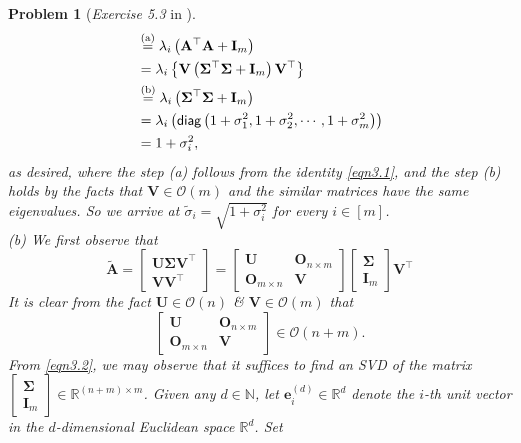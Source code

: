 \documentclass[11pt]{article}
\newtheorem{problem}{Problem}
\begin{document}
\begin{problem} [\emph{Exercise 5.3} in \cite{calafiore2014optimization}]
{\begin{equation*}
\begin{split}
        &\stackrel{\textnormal{(a)}}{=} \lambda_i \left( \mathbf{A}^{\top} \mathbf{A} + \mathbf{I}_m \right) \\
        &= \lambda_i \left\{ \mathbf{V} \left( \mathbf{\Sigma}^{\top} \mathbf{\Sigma} + \mathbf{I}_m \right) \mathbf{V}^{\top} \right\} \\
        &\stackrel{\textnormal{(b)}}{=} \lambda_i \left( \mathbf{\Sigma}^{\top} \mathbf{\Sigma} + \mathbf{I}_m \right) \\
        &= \lambda_i \left( \textsf{diag} \left( 1 + \sigma_{1}^2, 1 + \sigma_{2}^2, \cdots, 1 + \sigma_{m}^2 \right) \right) \\
        &= 1 + \sigma_{i}^2,
    \end{split}
\end{equation*}
as desired, where the step (a) follows from the identity \eqref{eqn3.1}, and the step (b) holds by the facts that $\mathbf{V} \in \mathcal{O}(m)$ and the similar matrices have the same eigenvalues. So we arrive at $\tilde{\sigma}_i = \sqrt{1 + \sigma_{i}^2}$ for every $i \in [m]$. \\ [10pt]
\indent (b) We first observe that
\begin{equation}
    \label{eqn3.2}
    \tilde{\mathbf{A}} =
    \begin{bmatrix}
        \mathbf{U} \mathbf{\Sigma} \mathbf{V}^{\top} \\
        \mathbf{V} \mathbf{V}^{\top}
    \end{bmatrix}
    =
    \begin{bmatrix}
        \mathbf{U} & \mathbf{O}_{n \times m} \\
        \mathbf{O}_{m \times n} & \mathbf{V}
    \end{bmatrix}
    \begin{bmatrix}
        \mathbf{\Sigma} \\ \mathbf{I}_m
    \end{bmatrix}
    \mathbf{V}^{\top}
\end{equation}
It is clear from the fact $\mathbf{U} \in \mathcal{O}(n)$ \& $\mathbf{V} \in \mathcal{O}(m)$ that
\begin{equation}
    \label{eqn3.3}
    \begin{bmatrix}
        \mathbf{U} & \mathbf{O}_{n \times m} \\
        \mathbf{O}_{m \times n} & \mathbf{V}
    \end{bmatrix}
    \in \mathcal{O}(n+m).
\end{equation}
From \eqref{eqn3.2}, we may observe that it suffices to find an \textsf{SVD} of the matrix $\begin{bmatrix} \mathbf{\Sigma} \\ \mathbf{I}_m \end{bmatrix} \in \mathbb{R}^{(n+m) \times m}$. Given any $d \in \mathbb{N}$, let $\mathbf{e}_{i}^{(d)} \in \mathbb{R}^d$ denote the $i$-th unit vector in the $d$-dimensional Euclidean space $\mathbb{R}^d$. Set
}
\end{problem}
\end{document}
